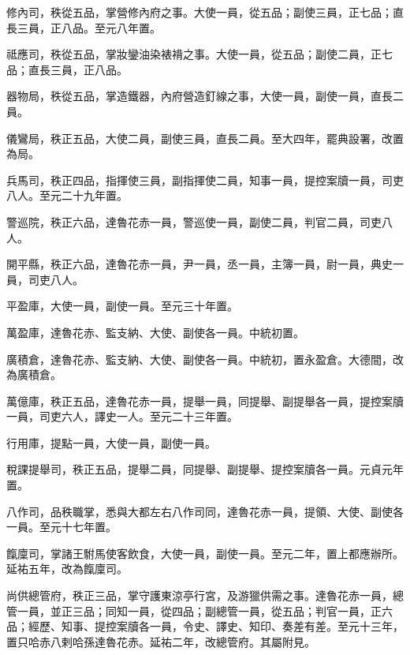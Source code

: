 \begin{pinyinscope}
 修內司，秩從五品，掌營修內府之事。大使一員，從五品；副使三員，正七品；直長三員，正八品。至元八年置。



 祗應司，秩從五品，掌妝鑾油染裱褙之事。大使一員，從五品；副使二員，正七品；直長三員，正八品。



 器物局，秩從五品，掌造鐵器，內府營造釘線之事，大使一員，副使一員，直長二員。



 儀鸞局，秩正五品，大使二員，副使三員，直長二員。至大四年，罷典設署，改置為局。



 兵馬司，秩正四品，指揮使三員，副指揮使二員，知事一員，提控案牘一員，司吏八人。至元二十九年置。



 警巡院，秩正六品，達魯花赤一員，警巡使一員，副使二員，判官二員，司吏八人。



 開平縣，秩正六品，達魯花赤一員，尹一員，丞一員，主簿一員，尉一員，典史一員，司吏八人。



 平盈庫，大使一員，副使一員。至元三十年置。



 萬盈庫，達魯花赤、監支納、大使、副使各一員。中統初置。



 廣積倉，達魯花赤、監支納、大使、副使各一員。中統初，置永盈倉。大德間，改為廣積倉。



 萬億庫，秩正五品，達魯花赤一員，提舉一員，同提舉、副提舉各一員，提控案牘一員，司吏六人，譯史一人。至元二十三年置。



 行用庫，提點一員，大使一員，副使一員。



 稅課提舉司，秩正五品，提舉二員，同提舉、副提舉、提控案牘各一員。元貞元年置。



 八作司，品秩職掌，悉與大都左右八作司同，達魯花赤一員，提領、大使、副使各一員。至元十七年置。



 餼廩司，掌諸王駙馬使客飲食，大使一員，副使一員。至元二年，置上都應辦所。延祐五年，改為餼廩司。



 尚供總管府，秩正三品，掌守護東涼亭行宮，及游獵供需之事。達魯花赤一員，總管一員，並正三品；同知一員，從四品；副總管一員，從五品；判官一員，正六品；經歷、知事、提控案牘各一員，令史、譯史、知印、奏差有差。至元十三年，置只哈赤八剌哈孫達魯花赤。延祐二年，改總管府。其屬附見。




\end{pinyinscope}
